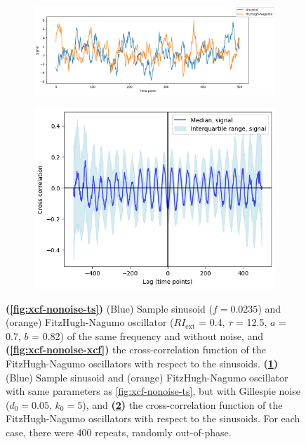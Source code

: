 \begin{figure}
  \begin{subfigure}[t]{0.6\textwidth}
  \centering
    \includegraphics[width=\linewidth]{sinusoid_and_fitzhughnagumo_gillnoise.png}
    \caption{
    }
    \label{fig:xcf-gillnoise-ts}
  \end{subfigure}%
  \centering
  \begin{subfigure}[t]{0.4\textwidth}
  \centering
    \includegraphics[width=\linewidth]{randomshift_sinusoid_fitzhughnagumo_gillnoise_xcf.png}
    \caption{
    }
    \label{fig:xcf-gillnoise-xcf}
  \end{subfigure}

  \caption[
    Sample sinusoid and FitzHugh-Nagumo oscillators without noise and with Gillespie noise, along with their cross-correlation functions.
  ]{
    \textbf{(\ref{fig:xcf-nonoise-ts})}
    (Blue) Sample sinusoid ($f = 0.0235$) and (orange) FitzHugh-Nagumo oscillator ($RI_{\mathrm{ext}}$ = 0.4, $\tau$ = 12.5, $a$ = 0.7, $b$ = 0.82) of the same frequency and without noise, and
    \textbf{(\ref{fig:xcf-nonoise-xcf})}
    the cross-correlation function of the FitzHugh-Nagumo oscillators with respect to the sinusoids.
    \textbf{(\ref{fig:xcf-gillnoise-ts})}
    (Blue) Sample sinusoid and (orange) FitzHugh-Nagumo oscillator with same parameters as \ref{fig:xcf-nonoise-ts}, but with Gillespie noise ($d_{0} = 0.05$, $k_{0} = 5$), and
    \textbf{(\ref{fig:xcf-gillnoise-xcf})}
    the cross-correlation function of the FitzHugh-Nagumo oscillators with respect to the sinusoids.
    For each case, there were 400 repeats, randomly out-of-phase.
  }
  \label{fig:xcf}
\end{figure}

